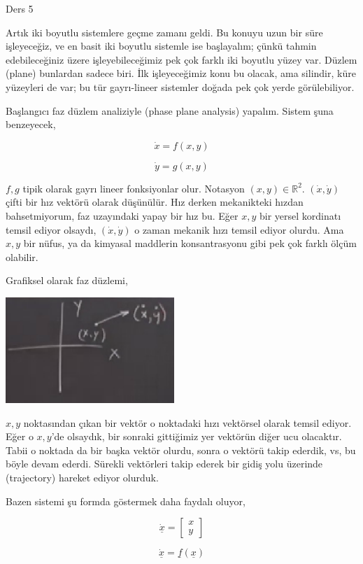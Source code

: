 \documentclass[12pt,fleqn]{article}\usepackage{../../common}
\begin{document}
Ders 5

Artık iki boyutlu sistemlere geçme zamanı geldi. Bu konuyu uzun bir süre
işleyeceğiz, ve en basit iki boyutlu sistemle ise başlayalım; çünkü tahmin
edebileceğiniz üzere işleyebileceğimiz pek çok farklı iki boyutlu yüzey
var. Düzlem (plane) bunlardan sadece biri. İlk işleyeceğimiz konu bu olacak, ama
silindir, küre yüzeyleri de var; bu tür gayrı-lineer sistemler doğada pek çok
yerde görülebiliyor.

Başlangıcı faz düzlem analiziyle (phase plane analysis) yapalım. Sistem şuna
benzeyecek,

$$ \dot{x} = f(x,y) $$

$$ \dot{y} = g(x,y) $$

$f,g$ tipik olarak gayrı lineer fonksiyonlar olur. Notasyon $(x,y) \in
\mathbb{R}^2$. $(\dot{x},\dot{y})$ çifti bir hız vektörü olarak düşünülür. Hız
derken mekanikteki hızdan bahsetmiyorum, faz uzayındaki yapay bir hız bu. Eğer
$x,y$ bir yersel kordinatı temsil ediyor olsaydı, $(\dot{x},\dot{y})$ o zaman
mekanik hızı temsil ediyor olurdu. Ama $x,y$ bir nüfus, ya da kimyasal maddlerin
konsantrasyonu gibi pek çok farklı ölçüm olabilir.

Grafiksel olarak faz düzlemi,

\includegraphics[height=4cm]{05_01.png}

$x,y$ noktasından çıkan bir vektör o noktadaki hızı vektörsel olarak temsil
ediyor. Eğer o $x,y$'de olsaydık, bir sonraki gittiğimiz yer vektörün diğer ucu
olacaktır. Tabii o noktada da bir başka vektör olurdu, sonra o vektörü takip
ederdik, vs, bu böyle devam ederdi. Sürekli vektörleri takip ederek bir gidiş
yolu üzerinde (trajectory) hareket ediyor olurduk.

Bazen sistemi şu formda göstermek daha faydalı oluyor,

$$ \dot{\underline{x}} =
\left[\begin{array}{r} x \\ y\end{array}\right]
$$

$$ \dot{\underline{x}} = \underline{f}(\underline{x}) $$
\end{document}
